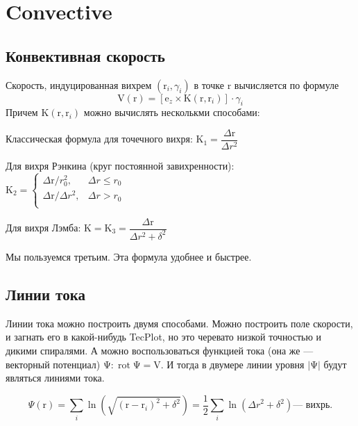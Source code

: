 \documentclass[11pt]{article}
\newcommand{\br}[1]{\boldsymbol{\mathrm{#1}}}
\DeclareMathOperator{\rot}{rot}
\newenvironment{packed_enum}{
\begin{enumerate}
  \setlength{\itemsep}{1pt}
  \setlength{\parskip}{0pt}
  \setlength{\parsep}{0pt}
}{\end{enumerate}}
\begin{document}
\section{Convective}
\subsection{Конвективная скорость}
Скорость, индуцированная вихрем $(\br r_i, \gamma_i)$ в точке $\br r$
вычисляется по формуле
\begin{equation*}
\br V(\br r) = [\br e_z \times \br K(\br r, \br r_i)] \cdot \gamma_i
\end{equation*}
Причем $\br K (\br r, \br r_i)$ можно вычислять несколькми способами:
\begin{packed_enum}
\item Классическая формула для точечного вихря:
$\br K_1 = \dfrac {\Delta\br r}{\Delta r^2}$

\item Для вихря Рэнкина (круг постоянной завихренности):
$\br K_2 = \begin{cases}
\Delta\br r / r_0^2,	&\Delta r \le r_0 \\
{\Delta\br r}/{\Delta r^2}, 	&\Delta r>r_0\\
\end{cases}$

\item Для вихря Лэмба:
$\br K = \br K_3 = \dfrac {\Delta\br r}{\Delta r^2 + \delta^2}$
\end{packed_enum}

Мы пользуемся третьим. Эта формула удобнее и быстрее.

\subsection{Линии тока}
Линии тока можно построить двумя способами. Можно построить поле скорости,
и загнать его в какой-нибудь TecPlot, но это черевато низкой точностью и дикими
спиралями. А можно воспользоваться функцией тока (она же --- векторный потенциал)
$\br\Psi: \rot\br\Psi = \br V$.
И тогда в двумере линии уровня $\lvert\br\Psi\rvert$ будут являться линиями тока.

\begin{equation*}
\Psi(\br r) = \sum_i \ln \left(\sqrt{(\br r - \br r_i)^2 + \delta^2} \right) = 
\dfrac{1}{2} \sum_i \ln \left({{\Delta r}^2 + \delta^2} \right) \text{--- вихрь.}
\end{equation*}
\end{document}
